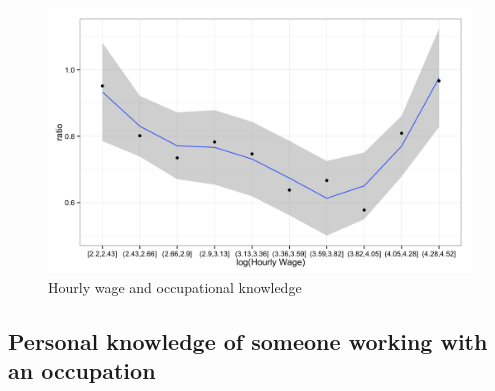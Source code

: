 \documentclass[11pt]{article}
\begin{document}
\begin{figure}
\caption{Hourly wage and occupational knowledge \label{fig:knowledge_by_wage}} 
\centering
\begin{minipage}{0.95 \linewidth}
\includegraphics[width = \linewidth]{./plots/knowledge_wage.png}
\end{minipage}  
\end{figure} 

\subsection{Personal knowledge of someone working with an occupation} 
\end{document}
